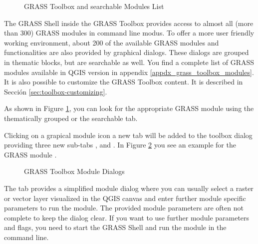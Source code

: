 \begin{figure}[h]
\centering
\caption{GRASS Toolbox and searchable Modules List \nixcaption}\label{fig:grass_modules}
   \goodgap
\end{figure}

The GRASS Shell inside the GRASS Toolbox provides access to almost all (more 
than 300) GRASS modules in command line modus. To offer a more user
friendly working environment, about 200 of the available GRASS modules and 
functionalities are also provided by graphical dialogs. These dialogs are 
grouped in thematic blocks, but are searchable as well. You find a complete 
list of GRASS modules available in QGIS version \CURRENT
in appendix \ref{appdx_grass_toolbox_modules}. It is also possible to 
customize the GRASS Toolbox content. It is described in Sección 
\ref{sec:toolbox-customizing}.

As shown in Figure \ref{fig:grass_modules}, you can look for the appropriate 
GRASS module using the thematically grouped  or the 
searchable  tab. 

Clicking on a grapical module icon a new tab will be added to the toolbox 
dialog providing three new sub-tabs ,  and 
. In Figure \ref{fig:grass_module_dialog} you see an example 
for the GRASS module .

\begin{figure}[h]
\centering
\caption{GRASS Toolbox Module Dialogs \nixcaption}\label{fig:grass_module_dialog}
   \goodgap
   \goodgap
\end{figure}


The  tab provides a simplified module dialog where you can 
usually select a raster or vector layer visualized in the QGIS canvas and 
enter further module specific parameters to run the module. The provided 
module parameters are often not complete to keep the dialog clear. If you want 
to use further module parameters and flags, you need to start the GRASS Shell 
and run the module in the command line.

